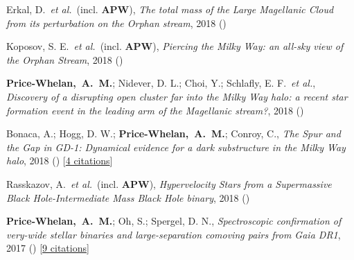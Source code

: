 \item[{\color{deemph}\scriptsize6}]Erkal, D.~\textit{et al.}~(incl. \textbf{APW}), \textit{The total mass of the Large Magellanic Cloud from its perturbation on the Orphan stream}, 2018 ()

\item[{\color{deemph}\scriptsize5}]Koposov, S. E.~\textit{et al.}~(incl. \textbf{APW}), \textit{Piercing the Milky Way: an all-sky view of the Orphan Stream}, 2018 ()

\item[{\color{deemph}\scriptsize4}]\textbf{Price-Whelan,~A.~M.}; Nidever, D. L.; Choi, Y.; Schlafly, E. F.~\textit{et al.}, \textit{Discovery of a disrupting open cluster far into the Milky Way halo: a recent star formation event in the leading arm of the Magellanic stream?}, 2018 ()

\item[{\color{deemph}\scriptsize3}]Bonaca, A.; Hogg, D. W.; \textbf{Price-Whelan,~A.~M.}; Conroy, C., \textit{The Spur and the Gap in GD-1: Dynamical evidence for a dark substructure in the Milky Way halo}, 2018 () [\href{http://adsabs.harvard.edu/abs/2018arXiv181103631B}{4 citations}]

\item[{\color{deemph}\scriptsize2}]Rasskazov, A.~\textit{et al.}~(incl. \textbf{APW}), \textit{Hypervelocity Stars from a Supermassive Black Hole-Intermediate Mass Black Hole binary}, 2018 ()

\item[{\color{deemph}\scriptsize1}]\textbf{Price-Whelan,~A.~M.}; Oh, S.; Spergel, D. N., \textit{Spectroscopic confirmation of very-wide stellar binaries and large-separation comoving pairs from Gaia DR1}, 2017 () [\href{http://adsabs.harvard.edu/abs/2017arXiv170903532P}{9 citations}]